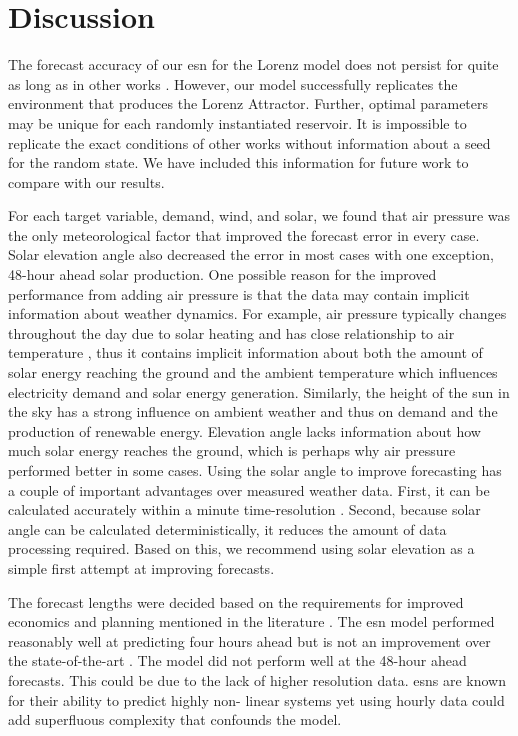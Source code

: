 \section{Discussion}

The forecast accuracy of our \gls{esn} for the Lorenz model does not persist
for quite as long as in other works \cite{pathak_using_2017}. However, our
model successfully replicates the environment that produces the Lorenz
Attractor. Further, optimal parameters may be unique for each randomly
instantiated reservoir. It is impossible to replicate the exact conditions of
other works without information about a seed for the random state. We have
included this information for future work to compare with our results.

For each target variable, demand, wind, and solar, we found that air pressure was
the only meteorological factor that improved the forecast error in every case.
Solar elevation angle also decreased the error in most cases with one exception,
48-hour ahead solar production. One possible reason for the improved performance
from adding air pressure is that the data may contain implicit information about
weather dynamics. For example, air pressure typically changes throughout the
day due to solar heating and has close relationship to air temperature
\cite{aguilar_seasonal_2001}, thus
it contains implicit information about both the amount of solar energy reaching
the ground and the ambient temperature which influences electricity demand
and solar energy generation.
Similarly, the height of the sun in the sky has a strong influence on
ambient weather and thus on  demand and the production of renewable energy.
Elevation angle lacks information about how much solar energy reaches the
ground, which is perhaps why air pressure performed better in some cases.
Using the solar angle to improve forecasting has a couple of important
advantages over measured weather data. First, it can be calculated accurately
within a minute time-resolution \cite{us_department_of_commerce_esrl_nodate}.
Second, because solar angle can be calculated deterministically, it reduces the
amount of data processing required. Based on this, we recommend using solar
elevation as a simple first attempt at improving forecasts.

The forecast lengths were decided based on the requirements for improved
economics and planning mentioned in the literature
 \cite{wang_quantifying_2016,mc_garrigle_quantifying_2015,brancucci_martinez-anido_value_2016}. The \gls{esn} model performed reasonably well at predicting
 four hours ahead but is not an improvement over the state-of-the-art
 \cite{wang_quantifying_2016,powers_weather_2017}. The model did not perform
 well at the 48-hour ahead forecasts. This could be due to the lack of higher
 resolution data. \glspl{esn} are known for their ability to predict highly non-
 linear systems \cite{jaeger_harnessing_2004,lukosevicius_reservoir_2009} yet
 using hourly data could add superfluous complexity \cite{garland_model-free_2014} that confounds the model.
